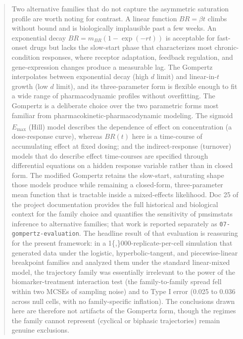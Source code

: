 \documentclass[
  11pt,
]{article}
\newenvironment{orig}{%
  \begin{quote}\normalsize\color[gray]{0.55}}{%
  \end{quote}}
\begin{document}
\begin{orig}
Two alternative families that do not capture the asymmetric
saturation profile are worth noting for contrast. A linear
function \(BR = \beta t\) climbs without bound and is biologically
implausible past a few weeks. An exponential decay
\(BR = m_{BR}(1 - \exp(-r t))\) is acceptable for fast-onset drugs
but lacks the slow-start phase that characterizes most
chronic-condition responses, where receptor adaptation, feedback
regulation, and gene-expression changes produce a measurable
lag. The Gompertz interpolates between exponential decay (high
\(d\) limit) and linear-in-\(t\) growth (low \(d\) limit), and its
three-parameter form is flexible enough to fit a wide range of
pharmacodynamic profiles without overfitting. The Gompertz is a
deliberate choice over the two parametric forms most familiar
from pharmacokinetic-pharmacodynamic modeling. The sigmoid
\(E_{\max}\) (Hill) model\textsuperscript{} describes the
dependence of effect on concentration (a dose-response curve),
whereas \(BR(t)\) here is a time-course of accumulating effect at
fixed dosing; and the indirect-response (turnover) models that
do describe effect time-courses are specified through
differential equations on a hidden response variable rather than
in closed form. The modified Gompertz retains the slow-start,
saturating shape those models produce while remaining a
closed-form, three-parameter mean function that is tractable
inside a mixed-effects likelihood. Doc 25 of the
project documentation provides the full historical and
biological context for the family choice and quantifies the
sensitivity of pmsimstats inference to alternative families;
that work is reported separately as \texttt{07-gompertz-evaluation}.
The headline result of that evaluation is reassuring for the present
framework: in a 1\{,\}000-replicate-per-cell simulation that generated
data under the logistic, hyperbolic-tangent, and piecewise-linear
breakpoint families and analyzed them under the standard linear-mixed
model, the trajectory family was essentially irrelevant to the power of
the biomarker-treatment interaction test (the family-to-family spread
fell within two MCSEs of sampling noise) and to
Type I error (0.025 to 0.036 across null cells, with no family-specific
inflation). The conclusions drawn here are therefore not artifacts of
the Gompertz form, though the regimes the family cannot represent
(cyclical or biphasic trajectories) remain genuine exclusions.

\end{orig}
\end{document}
